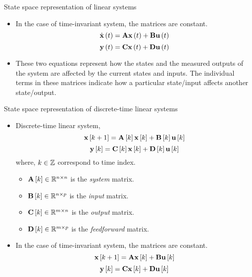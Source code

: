 \documentclass[aspectratio=169]{beamer}
\let\olditem\item
\renewcommand{\item}{\setlength{\itemsep}{\fill}\olditem}
\def\mf{\ensuremath\mathbf}
\def\mb{\ensuremath\mathbb}
\def\lp{\ensuremath\left(}
\def\rp{\ensuremath\right)}
\def\ls{\ensuremath\left[}
\def\rs{\ensuremath\right]}
\newcommand{\ct}[1]{\lp #1\rp}
\newcommand{\dt}[1]{\ls #1\rs}
\begin{document}
    
\begin{frame}[t]{State space representation of linear systems}
\begin{itemize}
    \item In the case of time-invariant system, the matrices are constant.
    \[ \dot{\mf{x}}\ct{t} = \mf{A}\mf{x}\ct{t} + \mf{B}\mf{u}\ct{t} \]
    \[ \mf{y}\ct{t} = \mf{C}\mf{x}\ct{t} + \mf{D}\mf{u}\ct{t} \]

    \item These two equations represent how the states and the measured outputs of the system are affected by the current states and inputs. The individual terms in these matrices indicate how a particular state/input affects another state/output.
\end{itemize}
\end{frame}


\begin{frame}{State space representation of discrete-time linear systems}
\begin{itemize}
    \item Discrete-time linear system,
    \[ \mf{x}\dt{k+1} = \mf{A}\dt{k}\mf{x}\dt{k} + \mf{B}\dt{k}\mf{u}\dt{k} \]
    \[ \mf{y}\dt{k} = \mf{C}\dt{k}\mf{x}\dt{k} + \mf{D}\dt{k}\mf{u}\dt{k} \]
    where, $k \in \mb{Z}$ correspond to time index.
    \begin{itemize}
        \item $\mf{A}\dt{k} \in \mb{R}^{n \times n}$ is the \textit{system} matrix.
        \item $\mf{B}\dt{k} \in \mb{R}^{n \times p}$ is the \textit{input} matrix.
        \item $\mf{C}\dt{k} \in \mb{R}^{m \times n}$ is the \textit{output} matrix.
        \item $\mf{D}\dt{k} \in \mb{R}^{m \times p}$ is the \textit{feedforward} matrix.
    \end{itemize}

    \item In the case of time-invariant system, the matrices are constant.
    \[ \mf{x}\dt{k+1} = \mf{A}\mf{x}\dt{k} + \mf{B}\mf{u}\dt{k} \]
    \[ \mf{y}\dt{k} = \mf{C}\mf{x}\dt{k} + \mf{D}\mf{u}\dt{k} \]
\end{itemize}
\end{frame}
\end{document}
